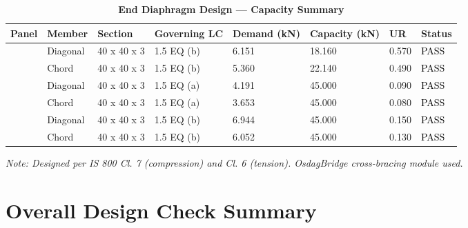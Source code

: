 \documentclass[12pt,a4paper]{report}
\numberwithin{table}{chapter}
\numberwithin{figure}{chapter}
\begin{document}
\vspace{1em}

\begin{longtable}{|C{2.0cm}|L{1.8cm}|C{2.2cm}|C{3.0cm}|C{1.8cm}|C{1.8cm}|C{1.2cm}|C{1.8cm}|}
\caption{\textbf{End Diaphragm Design --- Capacity Summary}}
\hline
\textbf{Panel} & \textbf{Member} & \textbf{Section} & \textbf{Governing LC} & \textbf{Demand (kN)} & \textbf{Capacity (kN)} & \textbf{UR} & \textbf{Status} \\[6pt]
\hline
{} & Diagonal & 40 x 40 x 3 & 1.5 EQ (b) & 6.151 & 18.160 & 0.570 & \textcolor{black}{PASS} \\[6pt]
 & Chord & 40 x 40 x 3 & 1.5 EQ (b) & 5.360 & 22.140 & 0.490 & \textcolor{black}{PASS} \\[6pt]
\hline
{} & Diagonal & 40 x 40 x 3 & 1.5 EQ (a) & 4.191 & 45.000 & 0.090 & \textcolor{black}{PASS} \\[6pt]
 & Chord & 40 x 40 x 3 & 1.5 EQ (a) & 3.653 & 45.000 & 0.080 & \textcolor{black}{PASS} \\[6pt]
\hline
{} & Diagonal & 40 x 40 x 3 & 1.5 EQ (b) & 6.944 & 45.000 & 0.150 & \textcolor{black}{PASS} \\[6pt]
 & Chord & 40 x 40 x 3 & 1.5 EQ (b) & 6.052 & 45.000 & 0.130 & \textcolor{black}{PASS} \\[6pt]
\hline
\end{longtable}
\noindent\textit{Note: Designed per IS 800 Cl. 7 (compression) and Cl. 6 (tension). OsdagBridge cross-bracing module used.}

\section{Overall Design Check Summary}
\label{sec:overall-summary}
\end{document}

